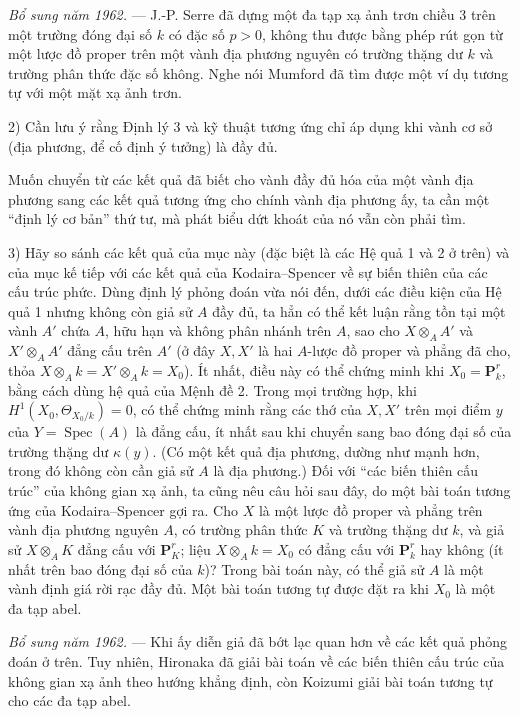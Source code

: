 \documentclass[11pt,twoside,openany]{book}
\numberwithin{equation}{section}
\newcommand{\src}[1]{%
  \phantomsection\hypertarget{src:\fgasourceid:#1}{}%
  \marginpar{\raggedleft\footnotesize\sffamily #1}%
}
\newcommand{\fgasourceid}{unset}
\begin{document}
\emph{Bổ sung năm 1962.} --- J.-P. Serre đã dựng một đa tạp xạ ảnh trơn chiều
3 trên một trường đóng đại số $k$ có đặc số $p>0$, không thu được bằng phép
rút gọn từ một lược đồ proper trên một vành địa phương nguyên có trường thặng
dư $k$ và trường phân thức đặc số không. Nghe nói Mumford đã tìm được một ví
dụ tương tự với một mặt xạ ảnh trơn.

2) Cần lưu ý rằng Định lý 3 và kỹ thuật tương ứng chỉ áp dụng khi vành cơ sở
(địa phương, để cố định ý tưởng) là đầy đủ.

Muốn chuyển từ các kết quả đã biết cho vành đầy đủ hóa của một vành địa phương
sang các kết quả tương ứng cho chính vành địa phương ấy, ta cần một “định lý
cơ bản” thứ tư, mà phát biểu dứt khoát của nó vẫn còn phải tìm.

\src{207}
3) Hãy so sánh các kết quả của mục này (đặc biệt là các Hệ quả 1 và 2 ở trên)
và của mục kế tiếp với các kết quả của Kodaira--Spencer về sự biến thiên của
các cấu trúc phức. Dùng định lý phỏng đoán vừa nói đến, dưới các điều kiện của
Hệ quả 1 nhưng không còn giả sử $A$ đầy đủ, ta hẳn có thể kết luận rằng tồn
tại một vành $A'$ chứa $A$, hữu hạn và không phân nhánh trên $A$, sao cho
$X\otimes_A A'$ và $X'\otimes_A A'$ đẳng cấu trên $A'$ (ở đây $X,X'$ là hai
$A$-lược đồ proper và phẳng đã cho, thỏa
$X\otimes_A k=X'\otimes_A k=X_0$). Ít nhất, điều này có thể chứng minh khi
$X_0=\mathbf P_k^r$, bằng cách dùng hệ quả của Mệnh đề 2. Trong mọi trường
hợp, khi $H^1(X_0,\Theta_{X_0/k})=0$, có thể chứng minh rằng các thớ của
$X,X'$ trên mọi điểm $y$ của $Y=\operatorname{Spec}(A)$ là đẳng cấu, ít nhất
sau khi chuyển sang bao đóng đại số của trường thặng dư $\kappa(y)$. (Có một
kết quả địa phương, dường như mạnh hơn, trong đó không còn cần giả sử $A$ là
địa phương.) Đối với “các biến thiên cấu trúc” của không gian xạ ảnh, ta cũng
nêu câu hỏi sau đây, do một bài toán tương ứng của Kodaira--Spencer gợi ra.
Cho $X$ là một lược đồ proper và phẳng trên vành địa phương nguyên $A$, có
trường phân thức $K$ và trường thặng dư $k$, và giả sử $X\otimes_A K$ đẳng
cấu với $\mathbf P_K^r$; liệu $X\otimes_A k=X_0$ có đẳng cấu với
$\mathbf P_k^r$ hay không (ít nhất trên bao đóng đại số của $k$)? Trong bài
toán này, có thể giả sử $A$ là một vành định giá rời rạc đầy đủ. Một bài toán
tương tự được đặt ra khi $X_0$ là một đa tạp abel.

\emph{Bổ sung năm 1962.} --- Khi ấy diễn giả đã bớt lạc quan hơn về các kết
quả phỏng đoán ở trên. Tuy nhiên, Hironaka đã giải bài toán về các biến thiên
cấu trúc của không gian xạ ảnh theo hướng khẳng định, còn Koizumi giải bài
toán tương tự cho các đa tạp abel.
\end{document}
